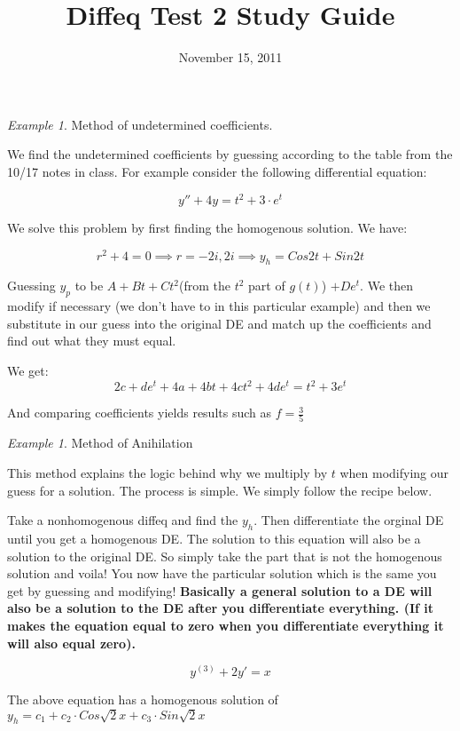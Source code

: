 \documentclass[10pt]{article}
\theoremstyle{definition}
\theoremstyle{remark}
\newtheorem{Ex}[Thm]{Example}
\theoremstyle{definition}
\begin{document}
  
\title{Diffeq Test 2 Study Guide}
\date{November 15, 2011}
\maketitle

\pagestyle{plain}   %
 
\begin{Ex}
Method of undetermined coefficients.
\end{Ex}
We find the undetermined coefficients by guessing according to the table from the 10/17 notes in class. For example consider the following differential equation:

$$
y''+4y=t^2+3\cdot e^t
$$

We solve this problem by first finding the homogenous solution. We have:

$$
r^2+4=0\implies r=-2i,2i\implies y_h=Cos{2t}+Sin{2t}
$$

Guessing $y_p$ to be $A+Bt+Ct^2$(from the $t^2$ part of $g(t)$) $+De^t$. We then modify if necessary (we don't have to in this particular example) and then we substitute in our guess into the original DE and match up the coefficients and find out what they must equal. 

We get:
$$
2c+de^t+4a+4bt+4ct^2+4de^t=t^2+3e^t
$$

And comparing coefficients yields results such as $f=\frac{3}{5}$

\begin{Ex}
Method of Anihilation
\end{Ex}
This method explains the logic behind why we multiply by $t$ when modifying our guess for a solution. The process is simple. We simply follow the recipe below. 

Take a nonhomogenous diffeq and find the $y_h$. Then differentiate the orginal DE until you get a homogenous DE. The solution to this equation will also be a solution to the original DE. So simply take the part that is not the homogenous solution and voila! You now have the particular solution which is the same you get by guessing and modifying! \textbf{Basically a general solution to a DE will also be a solution to the DE after you differentiate everything. (If it makes the equation equal to zero when you differentiate everything it will also equal zero).}

$$
y^{(3)}+2y'=x
$$

The above equation has a homogenous solution of $y_h=c_1+c_2\cdot Cos\sqrt{2}x+c_3\cdot Sin\sqrt{2}x$
\end{document}
